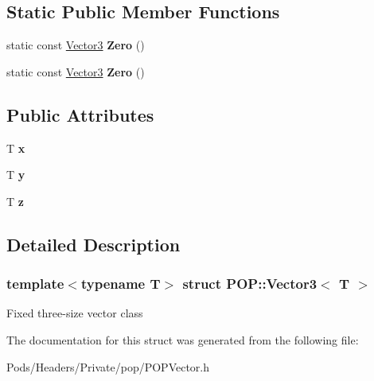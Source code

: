 \subsection*{Static Public Member Functions}
\begin{DoxyCompactItemize}
\item 
\mbox{\label{struct_p_o_p_1_1_vector3_abfd8d8f7a8e35376994efb24700eb271}} 
static const \mbox{\hyperlink{struct_p_o_p_1_1_vector3}{Vector3}} {\bfseries Zero} ()
\item 
\mbox{\label{struct_p_o_p_1_1_vector3_abfd8d8f7a8e35376994efb24700eb271}} 
static const \mbox{\hyperlink{struct_p_o_p_1_1_vector3}{Vector3}} {\bfseries Zero} ()
\end{DoxyCompactItemize}
\subsection*{Public Attributes}
\begin{DoxyCompactItemize}
\item 
\mbox{\label{struct_p_o_p_1_1_vector3_a7d505faeb020c1f27570d76db4da0efe}} 
T {\bfseries x}
\item 
\mbox{\label{struct_p_o_p_1_1_vector3_aee0840c2a4001cc4ee6768a108809588}} 
T {\bfseries y}
\item 
\mbox{\label{struct_p_o_p_1_1_vector3_a8e3978111fad67730c0ebb7a7cdba784}} 
T {\bfseries z}
\end{DoxyCompactItemize}


\subsection{Detailed Description}
\subsubsection*{template$<$typename T$>$\newline
struct P\+O\+P\+::\+Vector3$<$ T $>$}

Fixed three-\/size vector class 

The documentation for this struct was generated from the following file\+:\begin{DoxyCompactItemize}
\item 
Pods/\+Headers/\+Private/pop/P\+O\+P\+Vector.\+h\end{DoxyCompactItemize}
